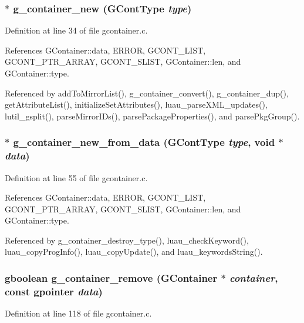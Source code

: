 \subsubsection{$\ast$ g\_\-container\_\-new ({\bf GCont\-Type} {\em type})}\label{gcontainer_8c_a2}




Definition at line 34 of file gcontainer.c.

References GContainer::data, ERROR, GCONT\_\-LIST, GCONT\_\-PTR\_\-ARRAY, GCONT\_\-SLIST, GContainer::len, and GContainer::type.

Referenced by add\-To\-Mirror\-List(), g\_\-container\_\-convert(), g\_\-container\_\-dup(), get\-Attribute\-List(), initialize\-Set\-Attributes(), luau\_\-parse\-XML\_\-updates(), lutil\_\-gsplit(), parse\-Mirror\-IDs(), parse\-Package\-Properties(), and parse\-Pkg\-Group().
\subsubsection{$\ast$ g\_\-container\_\-new\_\-from\_\-data ({\bf GCont\-Type} {\em type}, void $\ast$ {\em data})}\label{gcontainer_8c_a3}




Definition at line 55 of file gcontainer.c.

References GContainer::data, ERROR, GCONT\_\-LIST, GCONT\_\-PTR\_\-ARRAY, GCONT\_\-SLIST, GContainer::len, and GContainer::type.

Referenced by g\_\-container\_\-destroy\_\-type(), luau\_\-check\-Keyword(), luau\_\-copy\-Prog\-Info(), luau\_\-copy\-Update(), and luau\_\-keywords\-String().
\subsubsection{\setlength{\rightskip}{0pt plus 5cm}gboolean g\_\-container\_\-remove ({\bf GContainer} $\ast$ {\em container}, const gpointer {\em data})}\label{gcontainer_8c_a7}




Definition at line 118 of file gcontainer.c.

